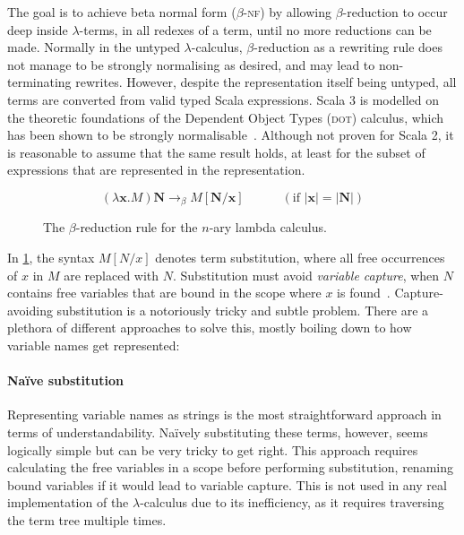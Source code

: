 \documentclass[../../main.tex]{subfiles}
\begin{document}
The goal is to achieve beta normal form ($\beta$-\textsc{nf}) by allowing $\beta$-reduction to occur deep inside $\lambda$-terms, in all redexes of a term, until no more reductions can be made.
Normally in the untyped $\lambda$-calculus, $\beta$-reduction as a rewriting rule does not manage to be strongly normalising as desired, and may lead to non-terminating rewrites.
However, despite the  representation itself being untyped, all  terms are converted from valid typed Scala expressions.
Scala 3 is modelled on the theoretic foundations of the Dependent Object Types (\textsc{dot}) calculus, which has been shown to be strongly normalisable~\cite{wang_strong_2017}.
Although not proven for Scala 2, it is reasonable to assume that the same result holds, at least for the subset of expressions that are represented in the  representation.

\begin{figure}[htbp]
\begin{equation*}
(\lambda \mathbf{x} . M) \mathbf{N} \rightarrow_\beta M[\mathbf{N}/\mathbf{x}] \hspace{3em} (\text{if } | \mathbf{x} | = | \mathbf{N} | )
\end{equation*}
\caption{The $\beta$-reduction rule for the $n$-ary lambda calculus.}
\label{fig:beta-reduction}
\end{figure}

In \cref{fig:beta-reduction}, the syntax $M[N/x]$ denotes term substitution, where all free occurrences of $x$ in $M$ are replaced with $N$.
Substitution must avoid \emph{variable capture}, when $N$ contains free variables that are bound in the scope where $x$ is found~\cite{van-bakel_tsfpl_2022}.
Capture-avoiding substitution is a notoriously tricky and subtle problem.
There are a plethora of different approaches to solve this, mostly boiling down to how variable names get represented:

\paragraph{Naïve substitution}
Representing variable names as strings is the most straightforward approach in terms of understandability.
Naïvely substituting these terms, however, seems logically simple but can be very tricky to get right.
This approach requires calculating the free variables in a scope before performing substitution, renaming bound variables if it would lead to variable capture.
This is not used in any real implementation of the $\lambda$-calculus due to its inefficiency, as it requires traversing the term tree multiple times.
\end{document}
